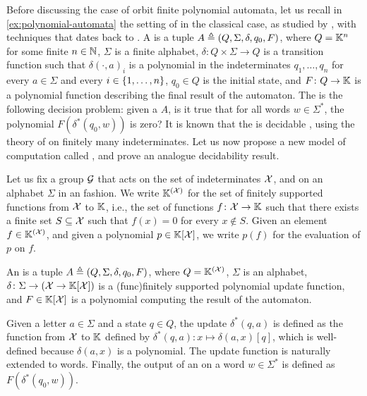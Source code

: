 \AP Before discussing the case of orbit finite polynomial automata, let us
recall in \cref{ex:polynomial-automata} the setting of 
in the classical case, as studied by \cite{BEDUSHWO17}, with techniques that
dates back to \cite{MULSEI02}. A  is a tuple $A
\triangleq (Q, \Sigma, \delta, q_0, F)$, where $Q = \mathbb{K}^n$ for some finite $n \in
\mathbb{N}$, $\Sigma$ is a finite alphabet, $\delta \colon Q \times \Sigma \to Q$ is a
transition function such that $\delta(\cdot,a)_i$ is a polynomial in the
indeterminates $q_1, \dots, q_n$ for every $a \in \Sigma$ and every $i \in
\{ 1, \dots, n \}$, $q_0 \in Q$ is the initial state, and $F \colon Q \to \mathbb{K}$
is a polynomial function describing the final result of the automaton. The
 is the following decision
problem: given a  $A$, is it true that for all words
$w \in \Sigma^*$, the polynomial $F(\delta^*(q_0, w))$ is zero? It is known
that the  is decidable
\cite{BEDUSHWO17}, using the theory of  on finitely many
indeterminates. Let us now propose a new model of computation called , and prove an analogue decidability result.

\AP Let us fix a group $\mathcal{G}$ that acts on the set of indeterminates
$\mathcal{X}$, and on an alphabet $\Sigma$ in an 
fashion. We write $\mathbb{K}^{(\mathcal{X})}$ for the set of finitely supported functions
from $\mathcal{X}$ to $\mathbb{K}$, i.e., the set of functions $f \colon \mathcal{X} \to \mathbb{K}$
such that there exists a finite set $S \subseteq \mathcal{X}$ such that $f(x) = 0$
for every $x \notin S$. Given an element $f \in \mathbb{K}^{(\mathcal{X})}$, and given a
polynomial $p \in \mathbb{K}[\mathcal{X}]$, we write $p(f)$ for the evaluation of
$p$ on $f$.


\begin{definition}
  \label{def:orbit-finite-polynomial-automaton}
  An  is a tuple $A \triangleq (Q, \Sigma, \delta, q_0, F)$, where $Q =
  \mathbb{K}^{(\mathcal{X})}$, $\Sigma$ is an  alphabet, $\delta \colon
  \Sigma \to (\mathcal{X} \to \mathbb{K}[\mathcal{X}])$ is a \kl(func){finitely supported}
  polynomial update function, and $F \in \mathbb{K}[\mathcal{X}]$ is a polynomial
  computing the result of the automaton. 

  Given a letter $a \in \Sigma$ and a
  state $q \in Q$, the update $\delta^*(q,a)$ is defined as the function from
  $\mathcal{X}$ to $\mathbb{K}$ defined by $\delta^*(q,a) \colon x \mapsto \delta(a,x)[ q ]$,
  which is well-defined because $\delta(a,x)$ is a 
  polynomial. The update function is naturally extended to words. Finally, the
  output of an  on a word $w \in \Sigma^*$
  is defined as $F(\delta^*(q_0, w))$.
\end{definition}


